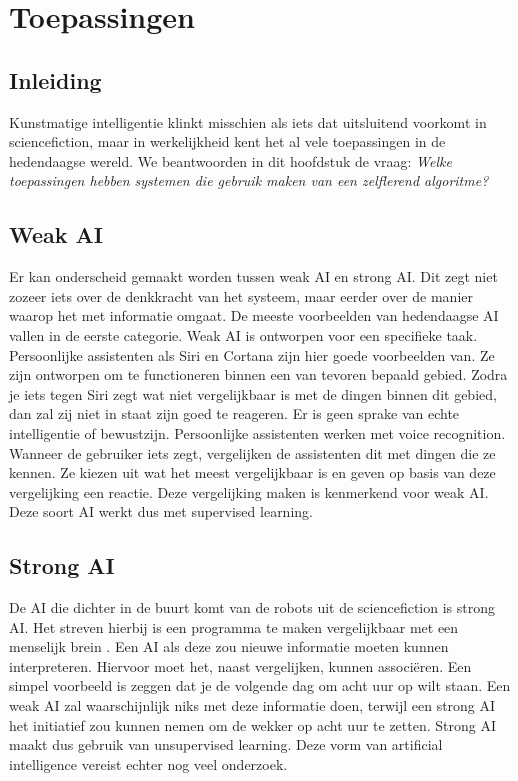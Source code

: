 \section{Toepassingen}

\subsection{Inleiding}
Kunstmatige intelligentie klinkt misschien als iets dat uitsluitend voorkomt in sciencefiction, maar in werkelijkheid kent het al vele toepassingen in de hedendaagse wereld. We beantwoorden in dit hoofdstuk de vraag: \textit{Welke toepassingen hebben systemen die gebruik maken van een zelflerend algoritme?}

\subsection{Weak AI}
Er kan onderscheid gemaakt worden tussen weak AI en strong AI. Dit zegt niet zozeer iets over de denkkracht van het systeem, maar eerder over de manier waarop het met informatie omgaat.
De meeste voorbeelden van hedendaagse AI vallen in de eerste categorie. Weak AI is ontworpen voor een specifieke taak. Persoonlijke assistenten als Siri en Cortana zijn hier goede voorbeelden van. Ze zijn ontworpen om te functioneren binnen een van tevoren bepaald gebied. Zodra je iets tegen Siri zegt wat niet vergelijkbaar is met de dingen binnen dit gebied, dan zal zij niet in staat zijn goed te reageren. Er is geen sprake van echte intelligentie of bewustzijn.
Persoonlijke assistenten werken met voice recognition. Wanneer de gebruiker iets zegt, vergelijken de assistenten dit met dingen die ze kennen. Ze kiezen uit wat het meest vergelijkbaar is en geven op basis van deze vergelijking een reactie. Deze vergelijking maken is kenmerkend voor weak AI. Deze soort AI werkt dus met supervised learning.

\subsection{Strong AI}
De AI die dichter in de buurt komt van de robots uit de sciencefiction is strong AI. Het streven hierbij is een programma te maken vergelijkbaar met een menselijk brein \cite{Searle}. Een AI als deze zou nieuwe informatie moeten kunnen interpreteren. Hiervoor moet het, naast vergelijken, kunnen associ\"{e}ren. Een simpel voorbeeld is zeggen dat je de volgende dag om acht uur op wilt staan. Een weak AI zal waarschijnlijk niks met deze informatie doen, terwijl een strong AI het initiatief zou kunnen nemen om de wekker op acht uur te zetten. Strong AI maakt dus gebruik van unsupervised learning.
Deze vorm van artificial intelligence vereist echter nog veel onderzoek.

